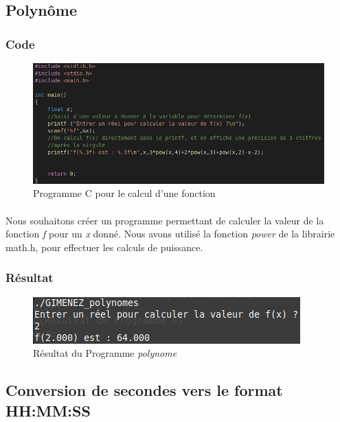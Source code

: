 \documentclass[10pt,a4paper]{article}
\begin{document}
\pagebreak
\subsection{Polynôme}
\subsubsection{Code}
	\begin{figure}[h]
	\begin{center}
	\includegraphics[scale=.3]{images/polynome_c}
	\end{center}
	\caption{Programme C pour le calcul d'une fonction}
	\end{figure}
\paragraph{}
	Nous souhaitons créer un programme permettant de calculer la valeur de la fonction 
	\emph{f} pour un \emph{x} donné. Nous avons utilisé la fonction \emph{power} de la librairie 
	math.h, pour effectuer les calculs de puissance.   
\subsubsection{Résultat}
	\begin{figure}[h]
	\begin{center}
	\includegraphics[scale=.3]{images/polynome_ex}
	\end{center}
	\caption{Résultat du Programme \emph{polynome}}
	\end{figure}

\pagebreak
\subsection{Conversion de secondes vers le format HH:MM:SS}
\end{document}
